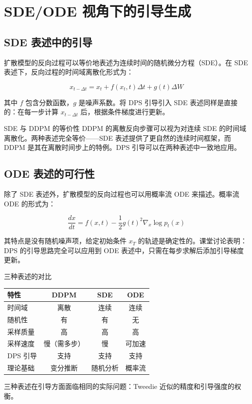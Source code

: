\section{SDE/ODE 视角下的引导生成}

\subsection{SDE 表述中的引导}

扩散模型的反向过程可以等价地表述为连续时间的随机微分方程（SDE）。在 SDE 表述下，反向过程的时间域离散化形式为：

$$x_{t-\Delta t} = x_t + f(x_t, t)\Delta t + g(t)\Delta W$$

其中 $f$ 包含分数函数，$g$ 是噪声系数。将 DPS 引导引入 SDE 表述同样是直接的：在每一步计算 $x_{t-\Delta t}$ 后，根据条件梯度进行更新。

\begin{importantbox}{SDE 与 DDPM 的等价性}
DDPM 的离散反向步骤可以视为对连续 SDE 的时间域离散化。两种表述完全等价——SDE 表述提供了更自然的连续时间框架，而 DDPM 是其在离散时间步上的特例。DPS 引导可以在两种表述中一致地应用。
\end{importantbox}

\subsection{ODE 表述的可行性}

除了 SDE 表述外，扩散模型的反向过程也可以用概率流 ODE 来描述。概率流 ODE 的形式为：

$$\frac{dx}{dt} = f(x, t) - \frac{1}{2}g(t)^2 \nabla_x \log p_t(x)$$

其特点是没有随机噪声项，给定初始条件 $x_T$ 的轨迹是确定性的。课堂讨论表明：DPS 的引导思路完全可以应用到 ODE 表述中，只需在每步求解后添加引导梯度更新。

\begin{knowledgebox}{三种表述的对比}
\begin{center}
\begin{tabular}{lccc}
\toprule
特性 & DDPM & SDE & ODE \\
\midrule
时间域 & 离散 & 连续 & 连续 \\
随机性 & 有 & 有 & 无 \\
采样质量 & 高 & 高 & 高 \\
采样速度 & 慢（需多步） & 慢 & 可加速 \\
DPS 引导 & 支持 & 支持 & 支持 \\
理论基础 & 变分推断 & 随机分析 & 概率流 \\
\bottomrule
\end{tabular}
\end{center}
三种表述在引导方面面临相同的实际问题：Tweedie 近似的精度和引导强度的权衡。
\end{knowledgebox}

